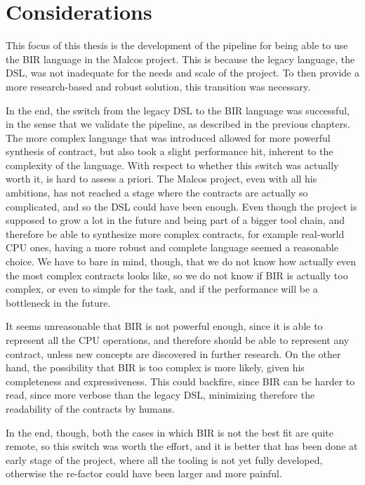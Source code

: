 \section{Considerations}
\label{cha:Considerations} This focus of this thesis is the development of the pipeline
for being able to use the BIR language in the Malcos project. This is because
the legacy language, the DSL, was not inadequate for the needs and scale of the
project. To then provide a more research-based and robust solution, this
transition was necessary.

In the end, the switch from the legacy DSL to the BIR language was successful,
in the sense that we validate the pipeline, as described in the previous chapters.
The more complex language that was introduced allowed for more powerful
synthesis of contract, but also took a slight performance hit, inherent to the
complexity of the language. With respect to whether this switch was actually worth
it, is hard to assess a priori. The Malcos project, even with all his ambitions,
has not reached a stage where the contracts are actually so complicated, and so
the DSL could have been enough. Even though the project is supposed to grow a lot
in the future and being part of a bigger tool chain, and therefore be able to
synthesize more complex contracts, for example real-world CPU ones, having a
more robust and complete language seemed a reasonable choice. We have to bare in
mind, though, that we do not know how actually even the most complex contracts looks
like, so we do not know if BIR is actually too complex, or even to simple for the
task, and if the performance will be a bottleneck in the future.

It seems unreasonable that BIR is not powerful enough, since it is able to represent
all the CPU operations, and therefore should be able to represent any contract, unless
new concepts are discovered in further research. On the other hand, the possibility
that BIR is too complex is more likely, given his completeness and
expressiveness. This could backfire, since BIR can be harder to read, since more
verbose than the legacy DSL, minimizing therefore the readability of the
contracts by humans.

In the end, though, both the cases in which BIR is not the best fit are quite
remote, so this switch was worth the effort, and it is better that has been done
at early stage of the project, where all the tooling is not yet fully developed,
otherwise the re-factor could have been larger and more painful.

